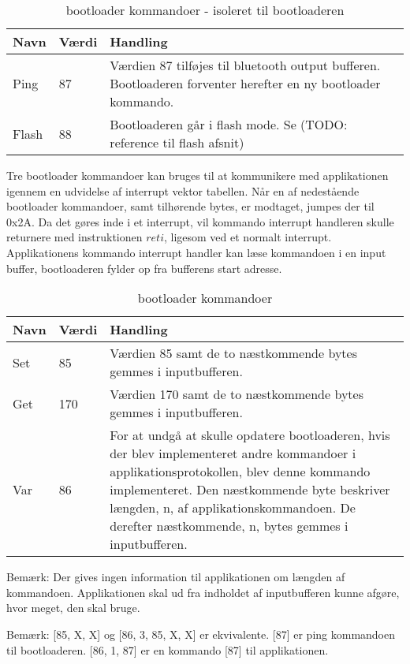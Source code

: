 \begin{table}[H]
	\caption{bootloader kommandoer - isoleret til bootloaderen}
	\label{tab:blappcommands}
	\centering

	\begin{tabular}{|l|l|p{13cm}|}
		\hline
		\textbf{Navn} & \textbf{Værdi} & \textbf{Handling} \\
		\hline
		Ping & 87 & Værdien 87 tilføjes til bluetooth output bufferen. Bootloaderen forventer herefter en ny bootloader kommando.\\
		\hline
		Flash & 88 & Bootloaderen går i flash mode. Se (TODO: reference til flash afsnit) \\
		\hline
	\end{tabular}
\end{table}

Tre bootloader kommandoer kan bruges til at kommunikere med applikationen igennem en udvidelse af interrupt vektor tabellen.
Når en af nedestående bootloader kommandoer, samt tilhørende bytes, er modtaget, jumpes der til 0x2A. Da det gøres inde i et interrupt, vil kommando interrupt handleren skulle returnere med instruktionen $reti$, ligesom ved et normalt interrupt. Applikationens kommando interrupt handler kan læse kommandoen i en input buffer, bootloaderen fylder op fra bufferens start adresse.

\begin{table}[H]
	\caption{bootloader kommandoer}
	\label{tab:blblcommands}
	\centering

	\begin{tabular}{|l|l|p{13cm}|}
		\hline
		\textbf{Navn} & \textbf{Værdi} & \textbf{Handling} \\
		\hline
		Set & 85 & Værdien 85 samt de to næstkommende bytes gemmes i inputbufferen.\\
		\hline
		Get & 170 & Værdien 170 samt de to næstkommende bytes gemmes i inputbufferen.\\
		\hline
		Var & 86 & For at undgå at skulle opdatere bootloaderen, hvis der blev implementeret andre kommandoer i applikationsprotokollen, blev denne kommando implementeret. Den næstkommende byte beskriver længden, n, af applikationskommandoen. De derefter næstkommende, n, bytes gemmes i inputbufferen.\\
		\hline
	\end{tabular}
\end{table}

\begin{mdquote}
	Bemærk: Der gives ingen information til applikationen om længden af kommandoen. Applikationen skal ud fra indholdet af inputbufferen kunne afgøre, hvor meget, den skal bruge.
\end{mdquote}
\begin{mdquote}
Bemærk: [85, X, X] og [86, 3, 85, X, X] er ekvivalente. [87] er ping kommandoen til bootloaderen. [86, 1, 87] er en kommando [87] til applikationen.
\end{mdquote}


